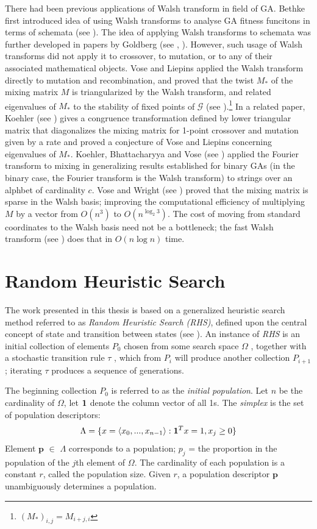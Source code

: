 There had been previous applications of Walsh transform in field of GA. Bethke first introduced 
idea of using Walsh transforms to analyse GA fitness funcitons in terms of schemata (see \cite{Bethke1981}). 
The idea of applying Walsh transforms to schemata was further developed in papers by Goldberg (see \cite{Goldberg1989a}, \cite{Goldberg1989b}). 
However, such usage of Walsh transforms did not apply it to crossover, to mutation, or to any of their 
associated mathematical objects. Vose and Liepins applied the Walsh transform directly to mutation and recombination, and proved that the 
twist $M_*$ of the mixing matrix $M$ is triangularized by the Walsh transform, and 
related eigenvalues of $M_*$ to the stability of fixed points of $\mathcal{G}$ (see \cite{VoseLiepins1991}).\footnote{$(M_*)_{i,j} = M_{i+j, i}$} 
In a related paper, Koehler (see \cite{Koehler1994}) gives a congruence 
transformation defined by lower triangular matrix that diagonalizes the mixing matrix for 1-point crossover and mutation 
given by a rate and proved a conjecture of Vose and Liepins concerning eigenvalues of $M_*$. Koehler, Bhattacharyya 
and Vose (see \cite{KoehlerBhatta1997}) applied the Fourier transform to mixing in generalizing results established 
for binary GAs (in the binary case, the Fourier transform is the Walsh transform) to 
strings over an alphbet of cardinality $c$. Vose and Wright (see \cite{VoseWright1998}) proved that 
the mixing matrix is sparse in the Walsh basis; improving the computational efficiency of multiplying $M$ by a vector from 
$O(n^3)$ to $O(n^{{\log}_2 3})$. The cost of moving from standard coordinates to the Walsh basis need not be a bottleneck; 
the fast Walsh transform (see \cite{Shanks1969}) does that in $O(n \log n)$ time.

\section{Random Heuristic Search}
The work presented in this thesis is based on a generalized heuristic search method referred 
to as {\em Random Heuristic Search (RHS)}, defined upon the central concept of state and transition 
between states (see \cite{Vose1999}). An instance of {\em RHS} is an initial collection of elements $P_0$ chosen 
from some search space $\Omega$ , together with a stochastic transition rule $\tau$ , which from $P_i$ will 
produce another collection $P_{i+1}$; iterating $\tau$ produces a sequence of generations.

The beginning collection $P_0$ is referred to as the {\em initial population}. Let $n$ be the cardinality 
of $\Omega$, let ${\bf1}$ denote the column vector of all 1s. 
The {\em simplex} is the set of population descriptors:
\[
\Lambda = \{x = \langle x_0,...,x_{n-1} \rangle: {\bf1}^T x=1, x_j \geq 0 \} %
\]
Element $\bm{p}$ $\in$ $\Lambda$ corresponds to a population;
$p_j$ = the proportion in the population of the $j$th element of $\Omega$. 
The cardinality of each population is a constant $r$, called the population size. 
Given $r$, a population descriptor $\bm{p}$ unambiguously determines a population.

